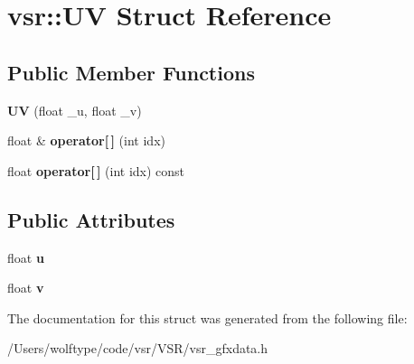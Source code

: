 \hypertarget{structvsr_1_1_u_v}{\section{vsr\-:\-:U\-V Struct Reference}
\label{structvsr_1_1_u_v}
}
\subsection*{Public Member Functions}
\begin{DoxyCompactItemize}
\item 
\hypertarget{structvsr_1_1_u_v_a08ac6430193bf8c233bb64a240087fae}{{\bfseries U\-V} (float \-\_\-u, float \-\_\-v)}\label{structvsr_1_1_u_v_a08ac6430193bf8c233bb64a240087fae}

\item 
\hypertarget{structvsr_1_1_u_v_a14a721aff3f66e9e27d4b128854b7a3a}{float \& {\bfseries operator\mbox{[}$\,$\mbox{]}} (int idx)}\label{structvsr_1_1_u_v_a14a721aff3f66e9e27d4b128854b7a3a}

\item 
\hypertarget{structvsr_1_1_u_v_a778e0f88e70ed107afb5650a12070f96}{float {\bfseries operator\mbox{[}$\,$\mbox{]}} (int idx) const }\label{structvsr_1_1_u_v_a778e0f88e70ed107afb5650a12070f96}

\end{DoxyCompactItemize}
\subsection*{Public Attributes}
\begin{DoxyCompactItemize}
\item 
\hypertarget{structvsr_1_1_u_v_a4f567ad20e2ce4d26fe9621b59011ed7}{float {\bfseries u}}\label{structvsr_1_1_u_v_a4f567ad20e2ce4d26fe9621b59011ed7}

\item 
\hypertarget{structvsr_1_1_u_v_a17e1e400e166542138adb9051faee9b8}{float {\bfseries v}}\label{structvsr_1_1_u_v_a17e1e400e166542138adb9051faee9b8}

\end{DoxyCompactItemize}


The documentation for this struct was generated from the following file\-:\begin{DoxyCompactItemize}
\item 
/\-Users/wolftype/code/vsr/\-V\-S\-R/vsr\-\_\-gfxdata.\-h\end{DoxyCompactItemize}
